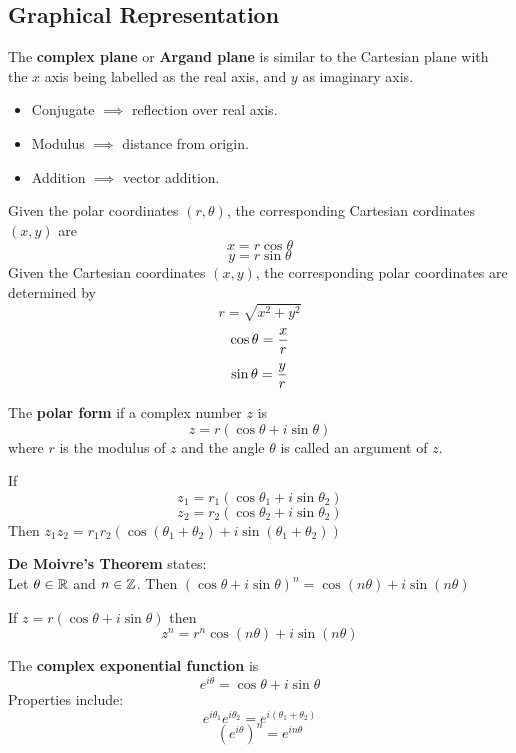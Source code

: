 \documentclass[english, 12pt]{article}
\begin{document}
\subsection{Graphical Representation}
\begin{defn}
The \textbf{complex plane} or \textbf{Argand plane} is similar to the Cartesian plane with the $x$ axis being labelled as the real axis, and $y$ as imaginary axis.
\end{defn}
\begin{itemize}
\item Conjugate $\implies$ reflection over real axis.
\item Modulus $\implies $ distance from origin.
\item Addition $\implies$ vector addition.
\end{itemize}
\begin{defn}
Given the polar coordinates $(r,\theta)$, the corresponding Cartesian cordinates $(x,y)$ are
\[ x = r \cos \theta\]
\[ y = r \sin \theta\]
Given the Cartesian coordinates $(x,y)$, the corresponding polar coordinates are determined by 
\[ r = \sqrt{x^2 + y^2}\]
\[ \cos \theta = \frac{x}{r}\]
\[ \sin \theta = \frac{y}{r}\]
\end{defn}
\begin{defn}
The \textbf{polar form} if a complex number $z$ is 
\[z = r (\cos \theta + i \sin \theta)\]
where $r$ is the modulus of $z$ and the angle $\theta$ is called an argument of $z$.
\end{defn}
\begin{thrm}
If
\[ z_{1} = r_{1} (\cos \theta_{1} + i \sin \theta_{2}) \]
\[ z_{2} = r_{2} (\cos \theta_{2} + i \sin \theta_{2}) \]
Then $z_{1} z_{2} = r_{1} r_{2} (\cos (\theta_{1} + \theta_{2}) + i \sin (\theta_{1} + \theta_{2}))$
\end{thrm}
\begin{thrm}[DMT]
\textbf{De Moivre's Theorem} states: \\
Let $\theta \in {\mathbb{R}}$ and $n \in {\mathbb{Z}}$. Then $(\cos \theta + i \sin \theta)^n = \cos (n\theta) + i \sin(n\theta)$
\end{thrm}
\begin{cor}
If $z = r (\cos \theta + i \sin \theta)$ then 
\[z^n = r^n \cos (n\theta) + i \sin(n\theta) \]
\end{cor}
\begin{defn}
The \textbf{complex exponential function} is
\[ e^{i\theta} = \cos \theta + i \sin \theta \]
Properties include:
\[e^{i\theta_{1}} e^{i\theta_{2}} = e^{i(\theta_{1} + \theta_{2})} \]
\[ (e^{i\theta})^n = e^{in\theta} \]

\end{defn}
\end{document}

